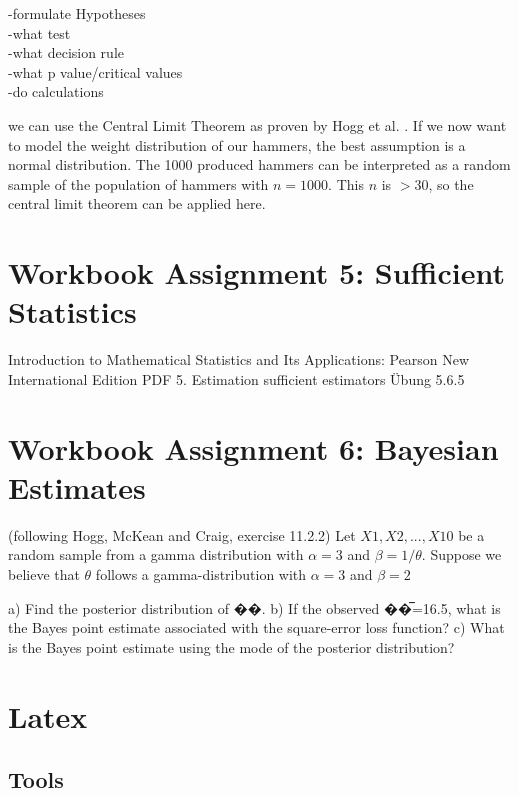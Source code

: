 -formulate Hypotheses\\
-what test\\
-what decision rule\\
-what p value/critical values\\
-do calculations




we can use the Central Limit Theorem as proven by Hogg et al. \cite[Theorem~5.3.1]{hogg}. 
If we now want to model the weight distribution of our hammers, the best assumption is a normal distribution. The 1000 produced hammers can be interpreted as a random sample of the population of hammers with $n = 1000$. This $n$ is $>30$, so the central limit theorem can be applied here. 



\chapter{Workbook Assignment 5: Sufficient Statistics}	

Introduction to Mathematical Statistics and Its Applications: Pearson New International Edition PDF 
5. Estimation
sufficient estimators
Übung 5.6.5


\chapter{Workbook Assignment 6: Bayesian Estimates}	

(following Hogg, McKean and Craig, exercise 11.2.2)
Let $X1, X2, ... , X10$ be a random sample from a gamma distribution with $\alpha =3$ and $\beta =1/\theta$. Suppose we believe that $\theta$ follows a gamma-distribution with $\alpha =3$ and $\beta = 2$

a) Find the posterior distribution of ��.
b) If the observed ��̅=16.5, what is the Bayes point estimate associated with the square-error loss function?
c) What is the Bayes point estimate using the mode of the posterior distribution?





\chapter{Latex}

\section{Tools}

